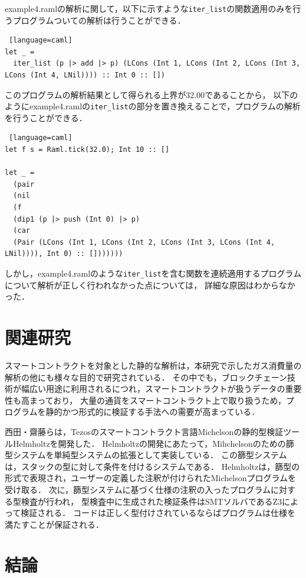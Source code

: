 \documentclass{kuisthesis}
\begin{document}
example4.ramlの解析に関して，以下に示すような{\tt iter\_list}の関数適用のみを行うプログラムついての解析は行うことができる．
\begin{lstlisting} [language=caml]
let _ =
  iter_list (p |> add |> p) (LCons (Int 1, LCons (Int 2, LCons (Int 3, LCons (Int 4, LNil)))) :: Int 0 :: [])
\end{lstlisting}
このプログラムの解析結果として得られる上界が32.00であることから，
以下のようにexample4.ramlの{\tt iter\_list}の部分を置き換えることで，プログラムの解析を行うことができる．
\begin{lstlisting} [language=caml]
let f s = Raml.tick(32.0); Int 10 :: []

let _ =
  (pair
  (nil
  (f
  (dip1 (p |> push (Int 0) |> p)
  (car
  (Pair (LCons (Int 1, LCons (Int 2, LCons (Int 3, LCons (Int 4, LNil)))), Int 0) :: []))))))
\end{lstlisting}

しかし，example4.ramlのような{\tt iter\_list}を含む関数を連続適用するプログラムについて解析が正しく行われなかった点については，
詳細な原因はわからなかった．

\section{関連研究} \label{sec-relate}
スマートコントラクトを対象とした静的な解析は，本研究で示したガス消費量の解析の他にも様々な目的で研究されている．
その中でも，ブロックチェーン技術が幅広い用途に利用されるにつれ，スマートコントラクトが扱うデータの重要性も高まっており，
大量の通貨をスマートコントラクト上で取り扱うため，プログラムを静的かつ形式的に検証する手法への需要が高まっている．

西田・齋藤らは，Tezosのスマートコントラクト言語Michelsonの静的型検証ツールHelmholtzを開発した．
Helmholtzの開発にあたって，Mihchelsonのための篩型システムを単純型システムの拡張として実装している．
この篩型システムは，スタックの型に対して条件を付けるシステムである．
Helmholtzは，篩型の形式で表現され，ユーザーの定義した注釈が付けられたMichelsonプログラムを受け取る．
次に，篩型システムに基づく仕様の注釈の入ったプログラムに対する型検査が行われ，
型検査中に生成された検証条件はSMTソルバであるZ3によって検証される．
コードは正しく型付けされているならばプログラムは仕様を満たすことが保証される．

\section{結論}\label{sec-conclusion}
\end{document}
